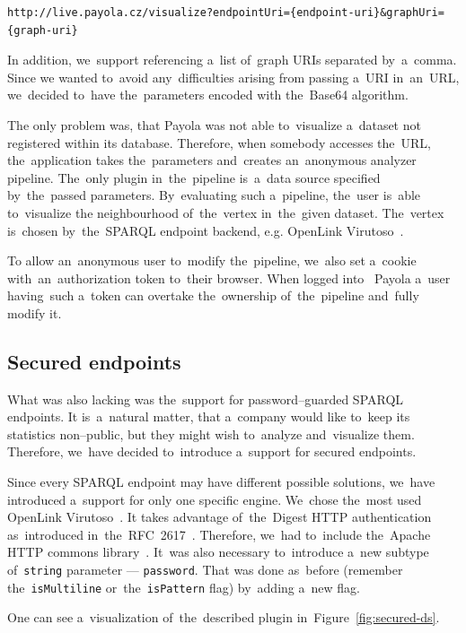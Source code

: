 {  \scriptsize
\begin{verbatim}
http://live.payola.cz/visualize?endpointUri={endpoint-uri}&graphUri={graph-uri}
\end{verbatim}
}

In addition, we~support referencing a~list of~graph URIs separated by~a~comma. Since 
we wanted to~avoid any~difficulties arising from passing a~URI in~an~URL, we~decided to~have the~parameters encoded with the~Base64 algorithm.

The only problem was, that Payola was not able to~visualize a~dataset not registered
within its database. Therefore, when somebody accesses the~URL, the~application takes the~parameters and~creates an~anonymous analyzer 
pipeline. The~only plugin in~the~pipeline is~a~data source specified by~the~passed parameters. By~evaluating such a~pipeline, the~user is~able to~visualize 
the neighbourhood of~the~vertex in~the~given dataset. The~vertex is~chosen by~the~SPARQL endpoint backend, e.g. OpenLink Virutoso~\cite{virtuoso}.

To allow an~anonymous user to~modify the~pipeline, we~also set a~cookie with~an~authorization token to~their browser. When logged into~ 
Payola a~user having~such a~token can overtake the~ownership of~the~pipeline and~fully modify it.

\subsection{Secured endpoints}
What was also lacking was the~support for password--guarded SPARQL endpoints. 
It is~a~natural matter, that a~company would like to~keep its statistics 
non--public, but they might wish to~analyze and~visualize them. Therefore, we~have decided to~introduce a~support for secured endpoints.

Since every SPARQL endpoint may have different possible solutions, we~have 
introduced a~support for only one specific engine. We~chose the~most
used OpenLink Virutoso~\cite{virtuoso}.
It takes advantage of~the~Digest HTTP authentication as~introduced in~the~RFC~2617~\cite{rfc-2617}. Therefore, we~had to~include the~Apache HTTP commons 
library~\cite{apache-http-commons}. It~was also necessary to~introduce a~new 
subtype of~\texttt{string} parameter --- \texttt{password}. That was done as~before (remember the~\texttt{isMultiline} or~the~\texttt{isPattern} flag) by~adding a~new flag.

One can see a~visualization of~the~described plugin in~Figure~\ref{fig:secured-ds}. 

